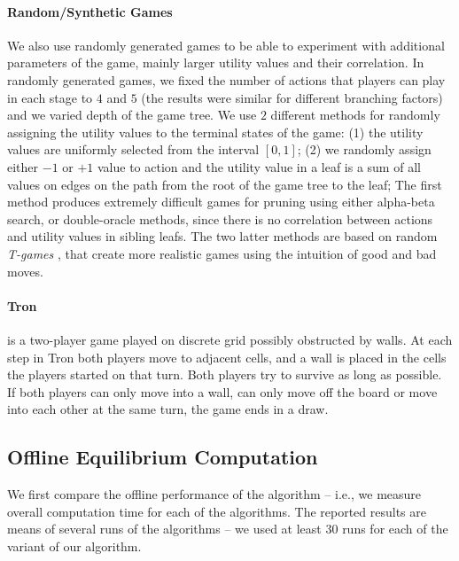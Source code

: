 \paragraph{\textbf{Random/Synthetic Games}}
We also use randomly generated games to be able to experiment with additional parameters of the game, mainly larger utility values and their correlation.
In randomly generated games, we fixed the number of actions that players can play in each stage to $4$ and $5$ (the results were similar for different branching factors) and we varied depth of the game tree. 
We use $2$ different methods for randomly assigning the utility values to the terminal states of the game: 
(1) the utility values are uniformly selected from the interval $\left[0,1\right]$; 
(2) we randomly assign either $-1$ or $+1$ value to action and the utility value in a leaf is a sum of all values on edges on the path from the root of the game tree to the leaf; 
The first method produces extremely difficult games for pruning using either alpha-beta search, or double-oracle methods, since there is no correlation between actions and utility values in sibling leafs. 
The two latter methods are based on random \emph{T-games} \cite{smith1995}, that create more realistic games using the intuition of good and bad moves.


\paragraph{\textbf{Tron}} is a two-player game played on discrete grid possibly obstructed by walls. At each
step in Tron both players move to adjacent cells, and a wall is placed in the cells the players started on that turn.
Both players try to survive as long as possible. If both players can only move into a wall, can only move off the board or move into each other at the same turn, the game ends  in a draw. 


\subsection{Offline Equilibrium Computation}
We first compare the offline performance of the algorithm -- i.e., we measure overall computation time for each of the algorithms. 
The reported results are means of several runs of the algorithms -- we used at least $30$ runs for each of the variant of our algorithm. 

